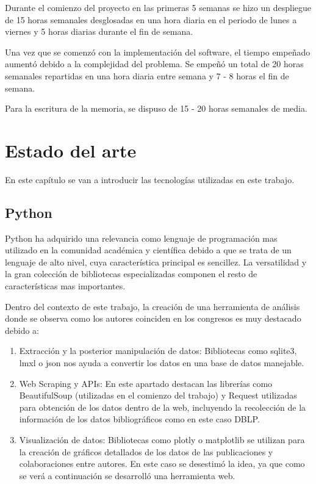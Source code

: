 \documentclass[a4paper, 12pt]{book}
\begin{document}
Durante el comienzo del proyecto en las primeras 5 semanas se hizo un despliegue de 15 horas semanales desglosadas en una hora diaria en el periodo de lunes a viernes y 5 horas diarias durante el fin de semana.

Una vez que se comenzó con la implementación del software, el tiempo empeñado aumentó debido a la complejidad del problema. Se empeñó un total de 20 horas semanales repartidas en una hora diaria entre semana y 7 - 8 horas el fin de semana.

Para la escritura de la memoria, se dispuso de 15 - 20 horas semanales de media.


\cleardoublepage
\chapter{Estado del arte}
\label{chap:estado}

        En este capítulo se van a introducir las tecnologías utilizadas en este trabajo.

\section{Python} 
\label{sec:seccion1}

Python ha adquirido una relevancia como lenguaje de programación mas utilizado en la comunidad académica y científica debido a que se trata de un lenguaje de alto nivel, cuya característica principal es sencillez. La versatilidad y la gran colección de bibliotecas especializadas componen el resto de características mas importantes.

Dentro del contexto de este trabajo, la creación de una herramienta de análisis donde se observa como los autores coinciden en los congresos es muy destacado debido a:

\begin{enumerate}
    \item Extracción y la posterior manipulación de datos: Bibliotecas como sqlite3, lmxl o json nos ayuda a convertir los datos en una base de datos manejable.
    
    \item Web Scraping y APIs: En este apartado destacan las librerías como BeautifulSoup (utilizadas en el comienzo del trabajo) y Request utilizadas para obtención de los datos dentro de la web, incluyendo la recolección de la información de los datos bibliográficos como en este caso DBLP.

    \item Visualización de datos: Bibliotecas como plotly o matplotlib se utilizan para la creación de gráficos detallados de los datos de las publicaciones y colaboraciones entre autores. En este caso se desestimó la idea, ya que como se verá a continuación se desarrolló una herramienta web.
\end{enumerate}
\end{document}
